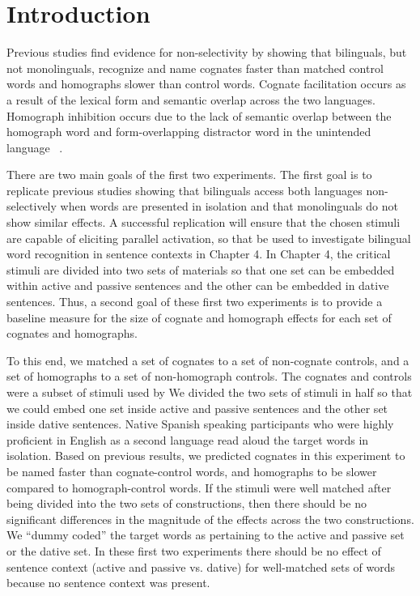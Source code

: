 \section{Introduction}
\label{introduction}

Previous studies find evidence for non-selectivity by showing that bilinguals, but not monolinguals, recognize and name cognates faster than matched control words and homographs slower than control words. Cognate facilitation occurs as a result of the lexical form and semantic overlap across the two languages. Homograph inhibition occurs due to the lack of semantic overlap between the homograph word and form-overlapping distractor word in the unintended language ~\citep[e.g.,][]{Dijkstra1998,Schwartz2007}. 

There are two main goals of the first two experiments. The first goal is to replicate previous studies showing that bilinguals access both languages non-selectively when words are presented in isolation and that monolinguals do not show similar effects. A successful replication will ensure that the chosen stimuli are capable of eliciting parallel activation, so that be used to investigate bilingual word recognition in sentence contexts in Chapter 4. In Chapter 4, the critical stimuli are divided into two sets of materials so that one set can be embedded within active and passive sentences and the other can be embedded in dative sentences. Thus, a second goal of these first two experiments is to provide a baseline measure for the size of cognate and homograph effects for each set of cognates and homographs.

To this end, we matched a set of cognates to a set of non-cognate controls, and a set of homographs to a set of non-homograph controls. The cognates and controls were a subset of stimuli used by  \citet{Gullifer2013} We divided the two sets of stimuli in half so that we could embed one set inside active and passive sentences and the other set inside dative sentences. Native Spanish speaking participants who were highly proficient in English as a second language read aloud the target words in isolation. Based on previous results, we predicted cognates in this experiment to be named faster than cognate-control words, and homographs to be slower compared to homograph-control words. If the stimuli were well matched after being divided into the two sets of constructions, then there should be no significant differences in the magnitude of the effects across the two constructions. We ``dummy coded'' the target words as pertaining to the active and passive set or the dative set. In these first two experiments there should be no effect of sentence context (active and passive vs. dative) for well-matched sets of words because no sentence context was present.

